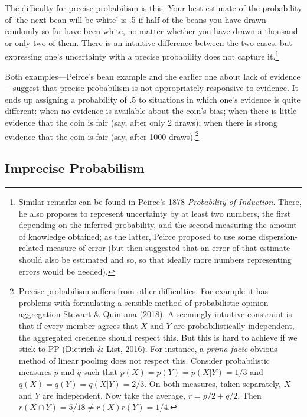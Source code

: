 \documentclass[
  10pt,
  dvipsnames,enabledeprecatedfontcommands]{scrartcl}
\begin{document}
\noindent The difficulty for precise probabilism is this. Your best
estimate of the probability of `the next bean will be white' is .5 if
half of the beans you have drawn randomly so far have been white, no
matter whether you have drawn a thousand or only two of them. There is
an intuitive difference between the two cases, but expressing one's
uncertainty with a precise probability does not capture it.\footnote{Similar
  remarks can be found in Peirce's 1878 \emph{Probability of Induction}.
  There, he also proposes to represent uncertainty by at least two
  numbers, the first depending on the inferred probability, and the
  second measuring the amount of knowledge obtained; as the latter,
  Peirce proposed to use some dispersion-related measure of error (but
  then suggested that an error of that estimate should also be estimated
  and so, so that ideally more numbers representing errors would be
  needed).}

Both examples---Peirce's bean example and the earlier one about lack of
evidence---suggest that precise probabilism is not appropriately
responsive to evidence. It ends up assigning a probability of .5 to
situations in which one's evidence is quite different: when no evidence
is available about the coin's bias; when there is little evidence that
the coin is fair (say, after only 2 draws); when there is strong
evidence that the coin is fair (say, after 1000 draws).\footnote{Precise
  probabilism suffers from other difficulties. For example it has
  problems with formulating a sensible method of probabilistic opinion
  aggregation Stewart \& Quintana (2018). A seemingly intuitive
  constraint is that if every member agrees that \(X\) and \(Y\) are
  probabilistically independent, the aggregated credence should respect
  this. But this is hard to achieve if we stick to PP (Dietrich \& List,
  2016). For instance, a \emph{prima facie} obvious method of linear
  pooling does not respect this. Consider probabilistic measures \(p\)
  and \(q\) such that \(p(X) = p(Y) = p(X\vert Y) = 1/3\) and
  \(q(X) = q(Y) = q(X\vert Y) = 2/3\). On both measures, taken
  separately, \(X\) and \(Y\) are independent. Now take the average,
  \(r=p/2+q/2\). Then \(r(X\cap Y) = 5/18 \neq r(X)r(Y)=1/4\).}

\hypertarget{imprecise-probabilism}{%
\subsection{Imprecise Probabilism}\label{imprecise-probabilism}}
\end{document}

